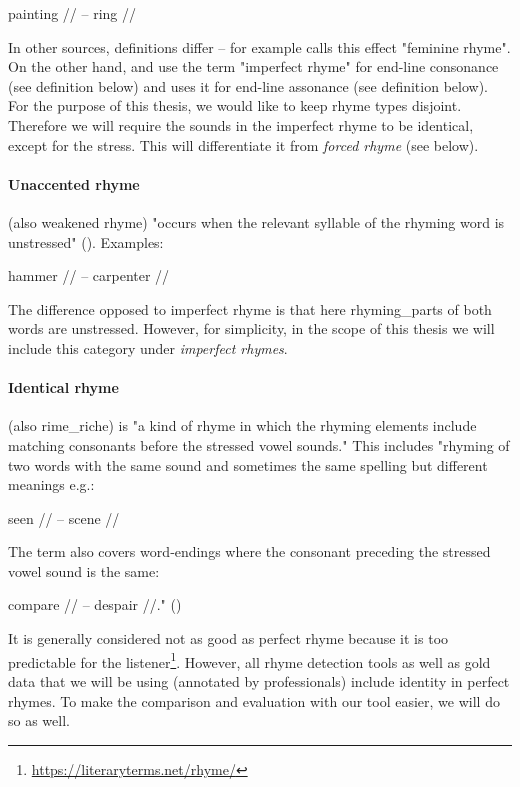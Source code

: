 painting // -- ring //

\noindent In other sources, definitions differ -- for example \cite{literarydevices2020} calls this effect "feminine rhyme".  On the other hand, \cite{oxforddict2008literary} and \cite{britannica} use the term "imperfect rhyme" for end-line consonance (see definition below) and \cite{vanphonological} uses it for end-line assonance (see definition below). For the purpose of this thesis, we would like to keep rhyme types disjoint. Therefore we will require the sounds in the imperfect rhyme to be identical, except for the stress. This will differentiate it from \textit{forced rhyme} (see below).


\paragraph{Unaccented rhyme} (also weakened rhyme) "occurs when the relevant syllable of the rhyming word is unstressed" (\cite{britannica}). Examples: 

hammer // -- carpenter //

\noindent The difference opposed to imperfect rhyme is that here \gls{rhyming_part}s of both words are unstressed. However, for simplicity, in the scope of this thesis we will include this category under \textit{imperfect rhymes}.


\paragraph{Identical rhyme} (also \gls{rime_riche}) is "a kind of rhyme in which the rhyming elements include matching consonants before the stressed vowel sounds." This includes "rhyming of two words with the same sound and sometimes the same spelling but different meanings e.g.:

 seen // -- scene //
 
 The term also covers word‐endings where the consonant preceding the stressed vowel sound is the same: 
 
 compare // -- despair //." (\cite{oxforddict2008literary})
 
 It is generally considered not as good as perfect rhyme because it is too predictable for the listener\footnote{\url{https://literaryterms.net/rhyme/}}. However, all rhyme detection tools as well as gold data that we will be using (annotated by professionals) include identity in perfect rhymes. To make the comparison and evaluation with our tool easier, we will do so as well.

